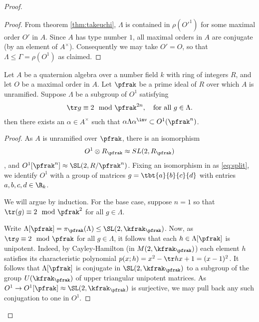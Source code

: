 \begin{proof}
\begin{proof}
    From theorem \ref{thm:takeuchi}, $\Lambda$ is contained in $\rho(O'^1)$ for some maximal order $O'$ in $A$. Since $A$ has type number $1$, all maximal orders in $A$ are conjugate (by an element of $A^\times$). Consequently we may take $O'=O$, so that $\Lambda \leq \Gamma = \rho(O^1)$ as claimed.


  \end{proof}
  \begin{lemma}\label{lemma:MangosteenPicosdeEuropa}
    Let $A$ be a quaternion algebra over a number field $k$ with ring of integers $R$, and let $O$ be a maximal order in $A$.
    Let $\pfrak$ be a prime ideal of $R$ over which $A$ is unramified.
    Suppose $\Lambda$ be a subgroup of $O^1$ satisfying
    \begin{align}\label{eq:trace}
      \tr g \equiv 2 \mod \pfrak^{2n}, \quad \text{for all $g \in \Lambda$}.
    \end{align}
    then there exists an $\alpha \in A^\times$ such that $\alpha \Lambda \alpha^\inv \subset O^1(\pfrak^n)$.
  \end{lemma}
  \begin{proof}


    As $A$ is unramified over $\pfrak$, there is an isomorphism
    \begin{align}\label{eq:split}
      O^1 \otimes R_\pfrak \approx SL(2,R_\pfrak)
    \end{align}, and $O^1[\pfrak^n] \approx \SL(2,R/\pfrak^n)$. Fixing an isomorphism in as \ref{eq:split}, we identify $O^1$ with a group of matrices $g = \tbt{a}{b}{c}{d}$ with entries $a,b,c,d \in \R_k$.

    We will argue by induction. For the base case, suppose $n=1$ so that $\tr(g) \equiv 2 \mod \pfrak^2$ for all $g \in \Lambda$.


    Write $\Lambda[\pfrak] = \pi_{\pfrak}(\Lambda)\leq \SL(2,\kfrak_\pfrak)$. Now, as $\tr g \equiv 2 \mod \pfrak$ for all $g \in \Lambda$, it follows that each $h \in \Lambda[\pfrak]$ is unipotent.
    Indeed, by Cayley-Hamilton (in $M(2,\kfrak_\pfrak)$) each element $h$ satisfies its characteristic polynomial $p(x;h)=x^2 - \tr h x + 1= (x-1)^2$.
    It follows that $\Lambda[\pfrak]$ is conjugate in $\SL(2,\kfrak_\pfrak)$ to a subgroup of the group $U(\kfrak_\pfrak)$ of upper triangular unipotent matrices. As $O^1 \to O^1[\pfrak]\approx \SL(2,\kfrak_\pfrak)$ is surjective, we may pull back any such conjugation to one in $O^1$.


\end{proof}
\end{proof}
